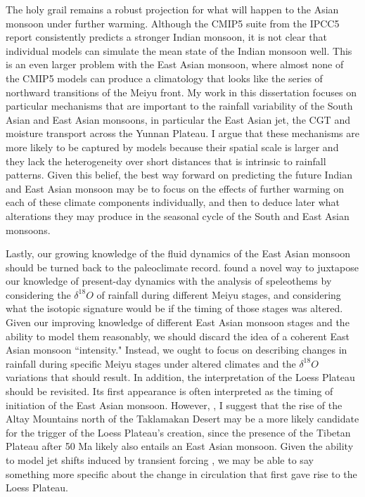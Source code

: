 	The holy grail remains a robust projection for what will happen to the Asian monsoon under further warming. Although the CMIP5 suite from the IPCC5 report consistently predicts a stronger Indian monsoon, it is not clear that individual models can simulate the mean state of the Indian monsoon well. This is an even larger problem with the East Asian monsoon, where almost none of the CMIP5 models can produce a climatology that looks like the series of northward transitions of the Meiyu front. My work in this dissertation focuses on particular mechanisms that are important to the rainfall variability of the South Asian and East Asian monsoons, in particular the East Asian jet, the CGT and moisture transport across the Yunnan Plateau. I argue that these mechanisms are more likely to be captured by models because their spatial scale is larger and they lack the heterogeneity over short distances that is intrinsic to rainfall patterns. Given this belief, the best way forward on predicting the future Indian and East Asian monsoon may be to focus on the effects of further warming on each of these climate components individually, and then to deduce later what alterations they may produce in the seasonal cycle of the South and East Asian monsoons.
	
	Lastly, our growing knowledge of the fluid dynamics of the East Asian monsoon should be turned back to the paleoclimate record. \citet{Chiang2015} found a novel way to juxtapose our knowledge of present-day dynamics with the analysis of speleothems by considering the $\delta ^{18}O$ of rainfall during different Meiyu stages, and considering what the isotopic signature would be if the timing of those stages was altered. Given our improving knowledge of different East Asian monsoon stages and the ability to model them reasonably, we should discard the idea of a coherent East Asian monsoon ``intensity." Instead, we ought to focus on describing changes in rainfall during specific Meiyu stages under altered climates and the $\delta ^{18}O$ variations that should result. In addition, the interpretation of the Loess Plateau should be revisited. Its first appearance is often interpreted as the timing of initiation of the East Asian monsoon. However, , I suggest that the rise of the Altay Mountains north of the Taklamakan Desert may be a more likely candidate for the trigger of the Loess Plateau's creation, since the presence of the Tibetan Plateau after 50 Ma likely also entails an East Asian monsoon. Given the ability to model jet shifts induced by transient forcing \citep{Liu2012}, we may be able to say something more specific about the change in circulation that first gave rise to the Loess Plateau.